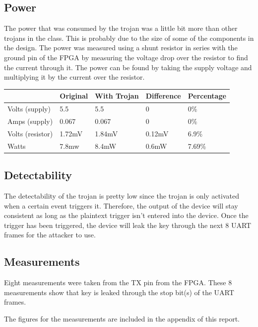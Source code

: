 \documentclass[letterpaper, 10 pt, conference]{ieeeconf}  %
\begin{document}
\subsection{Power}

The power that was consumed by the trojan was a little bit more than other trojans in the class. This is probably due to the size of some of the components in the design. The power was measured using a shunt resistor in series with the ground pin of the FPGA by measuring the voltage drop over the resistor to find the current through it. The power can be found by taking the supply voltage and multiplying it by the current over the resistor.

 \begin{center}
    \begin{tabular}{| l | l | l | l | l |}
        \hline
        & Original & With Trojan & Difference & Percentage \\ \hline
        Volts (supply) & 5.5 & 5.5 & 0 & 0\% \\ \hline
        Amps (supply) & 0.067 & 0.067 & 0 & 0\% \\ \hline
        Volts (resistor) & 1.72mV & 1.84mV & 0.12mV & 6.9\% \\
        Watts & 7.8mw & 8.4mW & 0.6mW & 7.69\% \\
        \hline
    \end{tabular}
\end{center}

\subsection{Detectability}

The detectability of the trojan is pretty low since the trojan is only activated when a certain event triggers it. Therefore, the output of the device will stay consistent as long as the plaintext trigger isn't entered into the device. Once the trigger has been triggered, the device will leak the key through the next 8 UART frames for the attacker to use.

\subsection{Measurements} 

Eight measurements were taken from the TX pin from the FPGA. These 8 measurements show that key is leaked through the stop bit(s) of the UART frames. 

The figures for the measurements are included in the appendix of this report.
\end{document}
